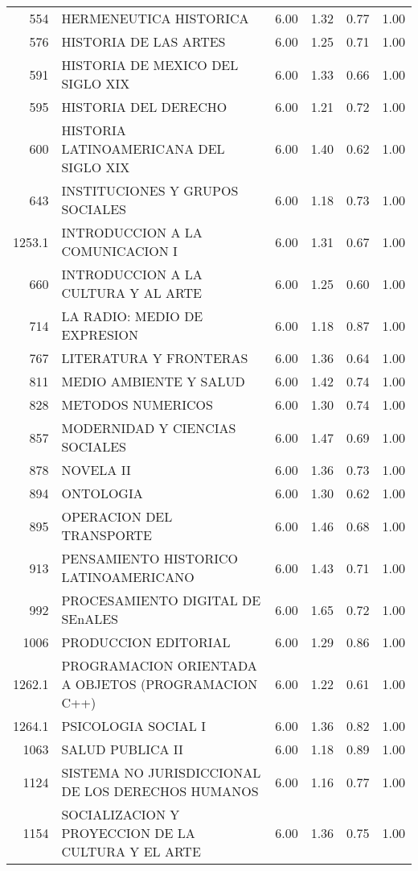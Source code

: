 \documentclass[12pt]{article}
\begin{document}
\begin{table}[ht]
\begin{tabular}{rlrrrr}
  554 & HERMENEUTICA HISTORICA & 6.00 & 1.32 & 0.77 & 1.00 \\ 
  576 & HISTORIA DE LAS ARTES & 6.00 & 1.25 & 0.71 & 1.00 \\ 
  591 & HISTORIA DE MEXICO DEL SIGLO XIX & 6.00 & 1.33 & 0.66 & 1.00 \\ 
  595 & HISTORIA DEL DERECHO & 6.00 & 1.21 & 0.72 & 1.00 \\ 
  600 & HISTORIA LATINOAMERICANA DEL SIGLO XIX & 6.00 & 1.40 & 0.62 & 1.00 \\ 
  643 & INSTITUCIONES Y GRUPOS SOCIALES & 6.00 & 1.18 & 0.73 & 1.00 \\ 
  1253.1 & INTRODUCCION A LA COMUNICACION I & 6.00 & 1.31 & 0.67 & 1.00 \\ 
  660 & INTRODUCCION A LA CULTURA Y AL ARTE & 6.00 & 1.25 & 0.60 & 1.00 \\ 
  714 & LA RADIO: MEDIO DE EXPRESION & 6.00 & 1.18 & 0.87 & 1.00 \\ 
  767 & LITERATURA Y FRONTERAS & 6.00 & 1.36 & 0.64 & 1.00 \\ 
  811 & MEDIO AMBIENTE Y SALUD & 6.00 & 1.42 & 0.74 & 1.00 \\ 
  828 & METODOS NUMERICOS & 6.00 & 1.30 & 0.74 & 1.00 \\ 
  857 & MODERNIDAD Y CIENCIAS SOCIALES & 6.00 & 1.47 & 0.69 & 1.00 \\ 
  878 & NOVELA II & 6.00 & 1.36 & 0.73 & 1.00 \\ 
  894 & ONTOLOGIA & 6.00 & 1.30 & 0.62 & 1.00 \\ 
  895 & OPERACION DEL TRANSPORTE & 6.00 & 1.46 & 0.68 & 1.00 \\ 
  913 & PENSAMIENTO HISTORICO LATINOAMERICANO & 6.00 & 1.43 & 0.71 & 1.00 \\ 
  992 & PROCESAMIENTO DIGITAL DE SEnALES & 6.00 & 1.65 & 0.72 & 1.00 \\ 
  1006 & PRODUCCION EDITORIAL & 6.00 & 1.29 & 0.86 & 1.00 \\ 
  1262.1 & PROGRAMACION ORIENTADA A OBJETOS (PROGRAMACION C++) & 6.00 & 1.22 & 0.61 & 1.00 \\ 
  1264.1 & PSICOLOGIA SOCIAL I & 6.00 & 1.36 & 0.82 & 1.00 \\ 
  1063 & SALUD PUBLICA II & 6.00 & 1.18 & 0.89 & 1.00 \\ 
  1124 & SISTEMA NO JURISDICCIONAL DE LOS DERECHOS HUMANOS & 6.00 & 1.16 & 0.77 & 1.00 \\ 
  1154 & SOCIALIZACION Y PROYECCION DE LA CULTURA Y EL ARTE & 6.00 & 1.36 & 0.75 & 1.00 \\ 

\end{tabular}
\end{table}
\end{document}

